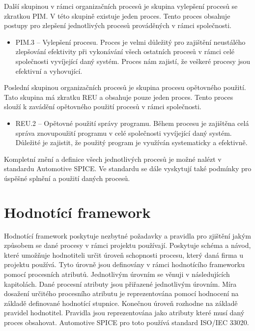 \documentclass[czech,master]{diploma}
\begin{document}
Další skupinou v rámci organizačních procesů je skupina vylepšení procesů se zkratkou PIM. V této skupině existuje jeden proces. Tento proces obsahuje postupy pro zlepšení jednotlivých procesů prováděných v rámci společnosti.

\begin{itemize}
	\item PIM.3 -- Vylepšení procesu. Proces je velmi důležitý pro zajištění neustálého zlepšování efektivity při vykonávání všech ostatních procesů v rámci celé společnosti vyvíjející daný systém. Proces nám zajistí, že veškeré procesy jsou efektivní a vyhovující.
\end{itemize}

Poslední skupinou organizačních procesů je skupina procesu opětovného použití. Tato skupina má zkratku REU a obsahuje pouze jeden proces. Tento proces slouží k zavádění opětovného použití procesů v rámci společnosti.

\begin{itemize}
	\item REU.2 -- Opětovné použití správy programu. Během procesu je zajištěna celá správa znovupoužití programu v celé společnosti vyvíjející daný systém. Důležité je zajistit, že použitý program je využíván systematicky a efektivně.
\end{itemize}


Kompletní znění a definice všech jednotlivých procesů je možné nalézt v standardu Automotive SPICE. \cite{ref:aspice_procesy} Ve standardu se dále vyskytují také podmínky pro úspěšné splnění a použití daných procesů.


\section{Hodnotící framework}
Hodnotící framework poskytuje nezbytné požadavky a pravidla pro zjištění jakým způsobem se dané procesy v rámci projektu používají. Poskytuje schéma a návod, které umožňuje hodnotiteli určit úroveň schopnosti procesu, který daná firma u projektu používá. Tyto úrovně jsou definovány v rámci hodnotícího frameworku pomocí procesních atributů. Jednotlivým úrovním se věnuji v následujících kapitolách. Dané procesní atributy jsou přiřazené jednotlivým úrovním. Míra dosažení určitého procesního atributu je reprezentována pomocí hodnocení na základě definované hodnotící stupnice. Konečnou úroveň rozhodne na základě pravidel hodnotitel. Pravidla jsou reprezentována jako atributy které musí daný proces obsahovat. Automotive SPICE pro toto používá standard ISO/IEC 33020. \cite{ref:aspice_download_1523}
\end{document}
